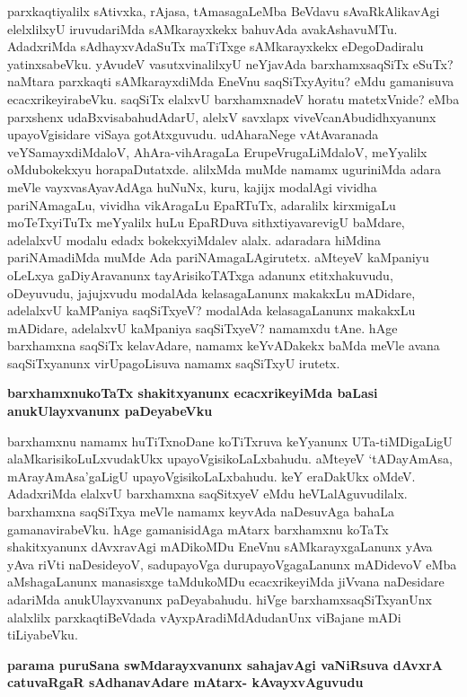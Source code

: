 parxkaqtiyalilx sAtivxka, rAjasa, tAmasagaLeMba BeVdavu sAvaRkAlikavAgi elelxlilxyU iruvudariMda sAMkarayxkekx bahuvAda avakAshavuMTu. AdadxriMda sAdhayxvAdaSuTx maTiTxge sAMkarayxkekx eDegoDadiralu yatinxsabeVku. yAvudeV vasutxvinalilxyU neYjavAda barxhamxsaqSiTx eSuTx? naMtara parxkaqti sAMkarayxdiMda EneVnu saqSiTxyAyitu? eMdu gamanisuva ecacxrikeyirabeVku. saqSiTx elalxvU barxhamxnadeV horatu matetxVnide? eMba parxshenx udaBxvisabahudAdarU, alelxV savxlapx viveVcanAbudidhxyanunx upayoVgisidare viSaya gotAtxguvudu. udAharaNege vAtAvaranada veYSamayxdiMdaloV, AhAra-vihAragaLa ErupeVrugaLiMdaloV, meYyalilx oMdubokekxyu horapaDutatxde. alilxMda muMde namamx uguriniMda adara meVle vayxvasAyavAdAga huNuNx, kuru, kajijx modalAgi vividha pariNAmagaLu, vividha vikAragaLu EpaRTuTx, adaralilx kirxmigaLu moTeTxyiTuTx meYyalilx huLu EpaRDuva sithxtiyavarevigU baMdare, adelalxvU modalu edadx bokekxyiMdalev alalx. adaradara hiMdina pariNAmadiMda muMde Ada pariNAmagaLAgirutetx. aMteyeV kaMpaniyu oLeLxya gaDiyAravanunx tayArisikoTATxga adanunx etitxhakuvudu, oDeyuvudu, jajujxvudu modalAda kelasagaLanunx makakxLu mADidare, adelalxvU kaMPaniya saqSiTxyeV? modalAda kelasagaLanunx makakxLu mADidare, adelalxvU kaMpaniya saqSiTxyeV? namamxdu tAne. hAge barxhamxna saqSiTx kelavAdare, namamx keYvADakekx baMda meVle avana saqSiTxyanunx virUpagoLisuva namamx saqSiTxyU irutetx.

{\bf barxhamxnukoTaTx shakitxyanunx ecacxrikeyiMda baLasi anukUlayxvanunx paDeyabeVku}

barxhamxnu namamx huTiTxnoDane koTiTxruva keYyanunx UTa-tiMDigaLigU alaMkarisikoLuLxvudakUkx upayoVgisikoLaLxbahudu. aMteyeV `tADayAmAsa, mArayAmAsa'gaLigU upayoVgisikoLaLxbahudu. keY eraDakUkx oMdeV. AdadxriMda elalxvU barxhamxna saqSitxyeV eMdu heVLalAguvudilalx. barxhamxna saqSiTxya meVle namamx keyvAda naDesuvAga bahaLa gamanavirabeVku. hAge gamanisidAga mAtarx barxhamxnu koTaTx shakitxyanunx dAvxravAgi mADikoMDu EneVnu sAMkarayxgaLanunx yAva yAva riVti naDesideyoV, sadupayoVga durupayoVgagaLanunx mADidevoV eMba aMshagaLanunx manasisxge taMdukoMDu ecacxrikeyiMda jiVvana naDesidare adariMda anukUlayxvanunx paDeyabahudu. hiVge barxhamxsaqSiTxyanUnx alalxlilx parxkaqtiBeVdada vAyxpAradiMdAdudanUnx viBajane mADi tiLiyabeVku.

{\bf parama puruSana swMdarayxvanunx sahajavAgi vaNiRsuva dAvxrA catuvaRgaR sAdhanavAdare mAtarx- kAvayxvAguvudu}

